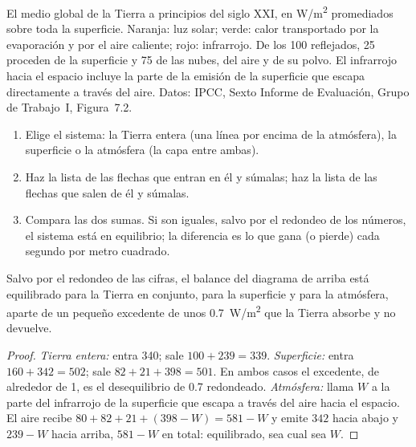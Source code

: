 \begin{omfigure}
{\small El  medio global de la Tierra a principios del
siglo XXI, en \unit{W/m^2} promediados sobre toda la superficie. Naranja: luz
solar; verde: calor transportado por la evaporación y por el aire caliente;
rojo: infrarrojo. De los 100 reflejados, 25 proceden de la superficie y 75 de
las nubes, del aire y de su polvo. El infrarrojo hacia el espacio incluye la
parte de la emisión de la superficie que escapa directamente a través del
aire. Datos: IPCC, Sexto Informe de Evaluación, Grupo de Trabajo~I,
Figura~7.2.}
\end{omfigure}

\begin{method}\label{met:g10:earth-energy-budget:reading}
\begin{enumerate}
  \item Elige el sistema: la Tierra entera (una línea por encima de la
        atmósfera), la superficie o la atmósfera (la capa entre ambas).
  \item Haz la lista de las flechas que entran en él y súmalas; haz la lista
        de las flechas que salen de él y súmalas.
  \item Compara las dos sumas. Si son iguales, salvo por el redondeo de los
        números, el sistema está en equilibrio; la diferencia es lo que gana
        (o pierde) cada segundo por metro cuadrado.
\end{enumerate}
\end{method}

\begin{proposition}\label{prop:g10:earth-energy-budget:balance}
Salvo por el redondeo de las cifras, el balance del diagrama de arriba está
equilibrado para la Tierra en conjunto, para la superficie y para la
atmósfera, aparte de un pequeño excedente de unos \qty{0.7}{W/m^2} que la
Tierra absorbe y no devuelve.
\end{proposition}

\begin{proof}
\emph{Tierra entera:} entra 340; sale $100 + 239 = 339$. \emph{Superficie:}
entra $160 + 342 = 502$; sale $82 + 21 + 398 = 501$. En ambos casos el
excedente, de alrededor de 1, es el desequilibrio de 0.7 redondeado.
\emph{Atmósfera:} llama $W$ a la parte del infrarrojo de la superficie que
escapa a través del aire hacia el espacio. El aire recibe
$80 + 82 + 21 + (398 - W) = 581 - W$ y emite $342$ hacia abajo y
$239 - W$ hacia arriba, $581 - W$ en total: equilibrado, sea cual sea $W$.
\end{proof}

